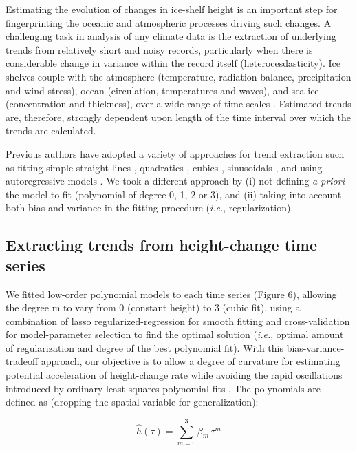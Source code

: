 Estimating the evolution of changes in ice-shelf height is an important step for fingerprinting the oceanic and atmospheric processes driving such changes. A challenging task in analysis of any climate data is the extraction of underlying trends from relatively short and noisy records, particularly when there is considerable change in variance within the record itself (heterocesdasticity). Ice shelves couple with the atmosphere (temperature, radiation balance, precipitation and wind stress), ocean (circulation, temperatures and waves), and sea ice (concentration and thickness), over a wide range of time scales \parencite{Paolo2015}. Estimated trends are, therefore, strongly dependent upon length of the time interval over which the trends are calculated.

Previous authors have adopted a variety of approaches for trend extraction such as fitting simple straight lines \parencite{Pritchard2012, Shepherd2010}, quadratics \parencite{Wingham2009}, cubics \parencite{Schenk2012}, sinusoidals \parencite{Zwally2005}, and using autoregressive models \parencite{Davis2005}. We took a different approach by (i) not defining {\it a-priori} the model to fit (polynomial of degree 0, 1, 2 or 3), and (ii) taking into account both bias and variance in the fitting procedure ({\it i.e.}, regularization).

\subsection{Extracting trends from height-change time series}

We fitted low-order polynomial models to each time series (Figure 6), allowing the degree m to vary from 0 (constant height) to 3 (cubic fit), using a combination of lasso regularized-regression for smooth fitting \parencite{Tibshirani1996} and cross-validation for model-parameter selection to find the optimal solution ({\it i.e.}, optimal amount of regularization and degree of the best polynomial fit). With this bias-variance-tradeoff approach, our objective is to allow a degree of curvature for estimating potential acceleration of height-change rate while avoiding the rapid oscillations introduced by ordinary least-squares polynomial fits \parencite{Paolo2015}. The polynomials are defined as (dropping the spatial variable for generalization):

\begin{equation}
  \hat h(\tau) = \sum_{m=0}^3 \beta_m \, \tau^m
  \label{c2e5}
\end{equation}

